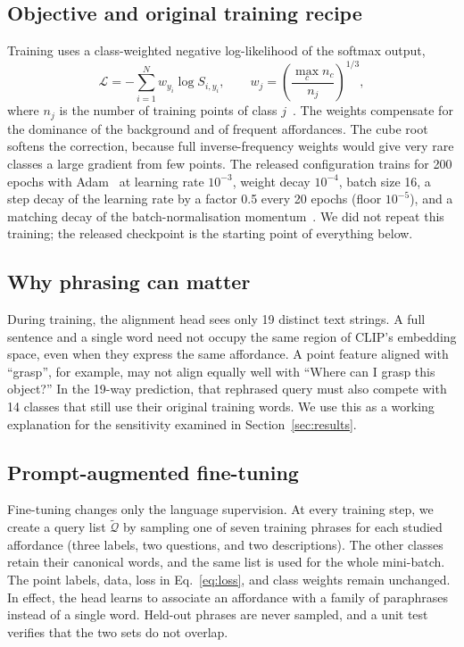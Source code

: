 \documentclass[conference]{IEEEtran}
\begin{document}
\subsection{Objective and original training recipe}
Training uses a class-weighted negative log-likelihood of the softmax output,
\begin{equation}
\mathcal{L}=-\sum_{i=1}^{N} w_{y_i}\log S_{i,y_i},\qquad w_j=\left(\frac{\max_c n_c}{n_j}\right)^{1/3},
\label{eq:loss}
\end{equation}
where $n_j$ is the number of training points of class $j$~\cite{openad}. The weights compensate for the dominance of the background and of frequent affordances. The cube root softens the correction, because full inverse-frequency weights would give very rare classes a large gradient from few points. The released configuration trains for 200 epochs with Adam~\cite{adam} at learning rate $10^{-3}$, weight decay $10^{-4}$, batch size 16, a step decay of the learning rate by a factor 0.5 every 20 epochs (floor $10^{-5}$), and a matching decay of the batch-normalisation momentum~\cite{batchnorm}. We did not repeat this training; the released checkpoint is the starting point of everything below.

\subsection{Why phrasing can matter}
During training, the alignment head sees only 19 distinct text strings. A full sentence and a single word need not occupy the same region of CLIP's embedding space, even when they express the same affordance. A point feature aligned with ``grasp'', for example, may not align equally well with ``Where can I grasp this object?'' In the 19-way prediction, that rephrased query must also compete with 14 classes that still use their original training words. We use this as a working explanation for the sensitivity examined in Section~\ref{sec:results}.

\subsection{Prompt-augmented fine-tuning}
\label{sec:finetune}
Fine-tuning changes only the language supervision. At every training step, we create a query list $\tilde{\mathcal{Q}}$ by sampling one of seven training phrases for each studied affordance (three labels, two questions, and two descriptions). The other classes retain their canonical words, and the same list is used for the whole mini-batch. The point labels, data, loss in Eq.~\eqref{eq:loss}, and class weights remain unchanged. In effect, the head learns to associate an affordance with a family of paraphrases instead of a single word. Held-out phrases are never sampled, and a unit test verifies that the two sets do not overlap.
\end{document}
